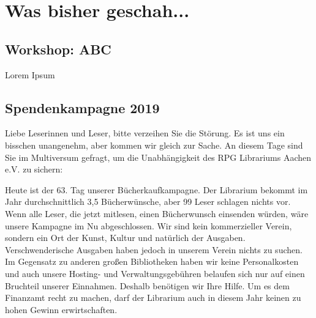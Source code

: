 
%



%






%



\makemultititle
%

\section{Was bisher geschah...}

\subsection{Workshop: ABC}
Lorem Ipsum

\subsection{Spendenkampagne 2019}
Liebe Leserinnen und Leser, bitte verzeihen Sie die Störung. Es ist uns
ein bisschen unangenehm, aber kommen wir gleich zur Sache. An diesem
Tage sind Sie im Multiversum gefragt, um die Unabhängigkeit des RPG
Librariums Aachen e.V. zu sichern:

Heute ist der 63. Tag unserer Bücherkaufkampagne. Der Librarium bekommt
im Jahr durchschnittlich 3,5 Bücherwünsche, aber 99%
Leser schlagen nichts vor. Wenn alle Leser, die jetzt mitlesen, einen
Bücherwunsch einsenden würden, wäre unsere Kampagne im Nu abgeschlossen.
Wir sind kein kommerzieller Verein, sondern ein Ort der Kunst, Kultur
und natürlich der Ausgaben. Verschwenderische Ausgaben haben jedoch in
unserem Verein nichts zu suchen. Im Gegensatz zu anderen großen
Bibliotheken haben wir keine Personalkosten und auch unsere Hosting- und
Verwaltungsgebühren belaufen sich nur auf einen Bruchteil unserer
Einnahmen. Deshalb benötigen wir Ihre Hilfe. Um es dem Finanzamt recht
zu machen, darf der Librarium auch in diesem Jahr keinen zu hohen Gewinn
erwirtschaften.

